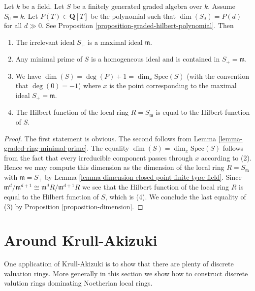 \begin{lemma}
\label{lemma-dimension-graded}
Let $k$ be a field.
Let $S$ be a finitely generated graded algebra over $k$.
Assume $S_0 = k$. Let $P(T) \in \mathbf{Q}[T]$ be the polynomial
such that $\dim(S_d) = P(d)$ for all $d \gg 0$. See
Proposition \ref{proposition-graded-hilbert-polynomial}.
Then
\begin{enumerate}
\item The irrelevant ideal $S_{+}$ is a maximal ideal $\mathfrak m$.
\item Any minimal prime of $S$ is a homogeneous ideal and is contained
in $S_{+} = \mathfrak m$.
\item We have $\dim(S) = \deg(P) + 1 = \dim_{x}\text{Spec}(S)$
(with the convention that $\deg(0) = -1$)
where $x$ is the point corresponding to the maximal ideal
$S_{+} = \mathfrak m$.
\item The Hilbert function of the local ring $R = S_{\mathfrak m}$
is equal to the Hilbert function of $S$.
\end{enumerate}
\end{lemma}

\begin{proof}
The first statement is obvious.
The second follows from Lemma \ref{lemma-graded-ring-minimal-prime}.
The equality $\dim(S) = \dim_{x}\text{Spec}(S)$ follows from the
fact that every irreducible component passes through $x$ according
to (2). Hence we may compute this dimension as the dimension of
the local ring $R = S_{\mathfrak m}$ with $\mathfrak m = S_{+}$ by
Lemma \ref{lemma-dimension-closed-point-finite-type-field}.
Since
$\mathfrak m^d/\mathfrak m^{d + 1} \cong \mathfrak m^dR/\mathfrak m^{d + 1}R$
we see that the Hilbert function of the local ring $R$ is equal to the
Hilbert function of $S$, which is (4). We conclude the last equality
of (3) by Proposition \ref{proposition-dimension}.
\end{proof}














\section{Around Krull-Akizuki}
\label{section-krull-akizuki}

\noindent
One application of Krull-Akizuki is to show that there are plenty
of discrete valuation rings. More generally in this section we
show how to construct discrete valution rings dominating Noetherian
local rings.

